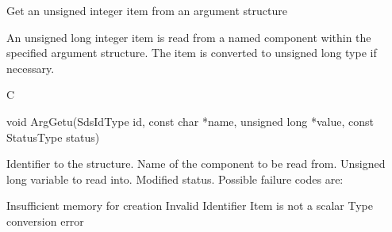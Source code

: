 \begin{manroutinedescription}
      Get an unsigned integer item from an argument structure

      An unsigned long integer item is read from a named component within the
      specified argument structure. The item is converted to unsigned long
      type if necessary.
 
      C

      void ArgGetu(SdsIdType id, const char *name, unsigned long *value, const %
StatusType {\mantt{*}} status)
 
\begin{manparametertable}
 Identifier to the structure.
 Name of the component to be read %
from.
 Unsigned long variable %
to read into.
 Modified status. Possible %
failure codes are:
\end{manparametertable}
\begin{mantwocolumntable}
Insufficient memory for creation
Invalid Identifier
Item is not a scalar
Type conversion error
\end{mantwocolumntable}
\end{manroutinedescription}
